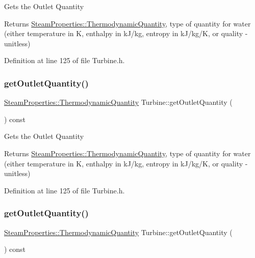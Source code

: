 Gets the Outlet Quantity

\begin{DoxyReturn}{Returns}
\hyperlink{class_steam_properties_ae0294bedf7d178c2d8fb6aed0f62fbff}{Steam\+Properties\+::\+Thermodynamic\+Quantity}, type of quantity for water (either temperature in K, enthalpy in k\+J/kg, entropy in k\+J/kg/K, or quality -\/ unitless) 
\end{DoxyReturn}


Definition at line 125 of file Turbine.\+h.

\mbox{\label{class_turbine_acd3e98ab67754b652de97498d9bec6d2}} 
\subsubsection{\texorpdfstring{get\+Outlet\+Quantity()}{getOutletQuantity()}\hspace{0.1cm}{\footnotesize\ttfamily [2/3]}}
{\footnotesize\ttfamily \hyperlink{class_steam_properties_ae0294bedf7d178c2d8fb6aed0f62fbff}{Steam\+Properties\+::\+Thermodynamic\+Quantity} Turbine\+::get\+Outlet\+Quantity (\begin{DoxyParamCaption}{ }\end{DoxyParamCaption}) const\hspace{0.3cm}{\ttfamily [inline]}}

Gets the Outlet Quantity

\begin{DoxyReturn}{Returns}
\hyperlink{class_steam_properties_ae0294bedf7d178c2d8fb6aed0f62fbff}{Steam\+Properties\+::\+Thermodynamic\+Quantity}, type of quantity for water (either temperature in K, enthalpy in k\+J/kg, entropy in k\+J/kg/K, or quality -\/ unitless) 
\end{DoxyReturn}


Definition at line 125 of file Turbine.\+h.

\mbox{\label{class_turbine_acd3e98ab67754b652de97498d9bec6d2}} 
\subsubsection{\texorpdfstring{get\+Outlet\+Quantity()}{getOutletQuantity()}\hspace{0.1cm}{\footnotesize\ttfamily [3/3]}}
{\footnotesize\ttfamily \hyperlink{class_steam_properties_ae0294bedf7d178c2d8fb6aed0f62fbff}{Steam\+Properties\+::\+Thermodynamic\+Quantity} Turbine\+::get\+Outlet\+Quantity (\begin{DoxyParamCaption}{ }\end{DoxyParamCaption}) const\hspace{0.3cm}{\ttfamily [inline]}}

